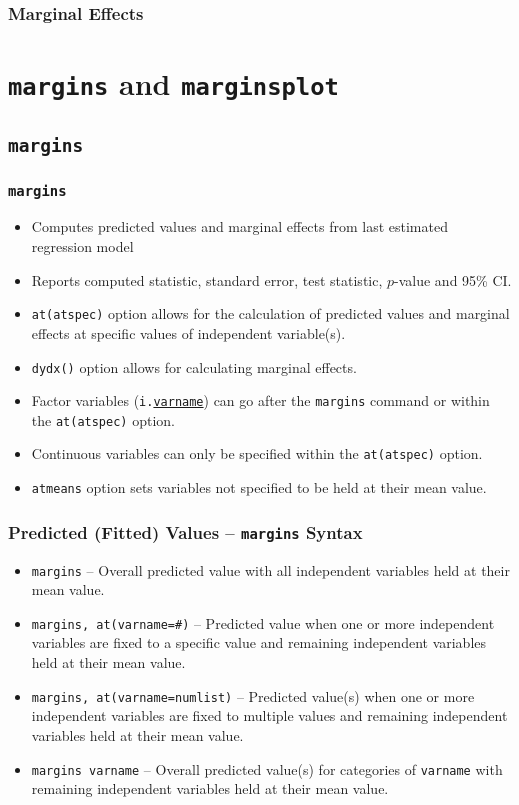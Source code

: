 \documentclass{beamer}
\begin{document}
\begin{frame}
	\frametitle{Marginal Effects}
		\begin{figure}[p]
			\centering
			\label{fig:fig1}
		\end{figure}
\end{frame}

\section{\texttt{margins} and \texttt{marginsplot}}
\subsection{\texttt{margins}}

\begin{frame}
	\frametitle{\texttt{margins}}
	\begin{itemize}
		\item Computes predicted values and marginal effects from last estimated regression model
		\item Reports computed statistic, standard error, test statistic, $p$-value and 95\% CI.
		\item \texttt{at(atspec)} option allows for the calculation of predicted values and marginal effects at specific values of independent variable(s).
		\item \texttt{dydx()} option allows for calculating marginal effects.
		\item Factor variables (\texttt{i.\underline{varname}}) can go after the \texttt{margins} command or within the \texttt{at(atspec)} option.
		\item Continuous variables can only be specified within the \texttt{at(atspec)} option.
		\item \texttt{atmeans} option sets variables not specified to be held at their mean value.
	\end{itemize}
\end{frame}

\begin{frame}
	\frametitle{Predicted (Fitted) Values -- \texttt{margins} Syntax}
		\begin{itemize}
			\item \texttt{margins} -- Overall predicted value with all independent variables held at their mean value.
			\item \texttt{margins, at(varname=\#)} -- Predicted value when one or more independent variables are fixed to a specific value and remaining independent variables held at their mean value.
			\item \texttt{margins, at(varname=numlist)} -- Predicted value(s) when one or more independent variables are fixed to multiple values and remaining independent variables held at their mean value.
			\item \texttt{margins varname} -- Overall predicted value(s) for categories of \texttt{varname} with remaining independent variables held at their mean value.
		\end{itemize}
\end{frame}
\end{document}

